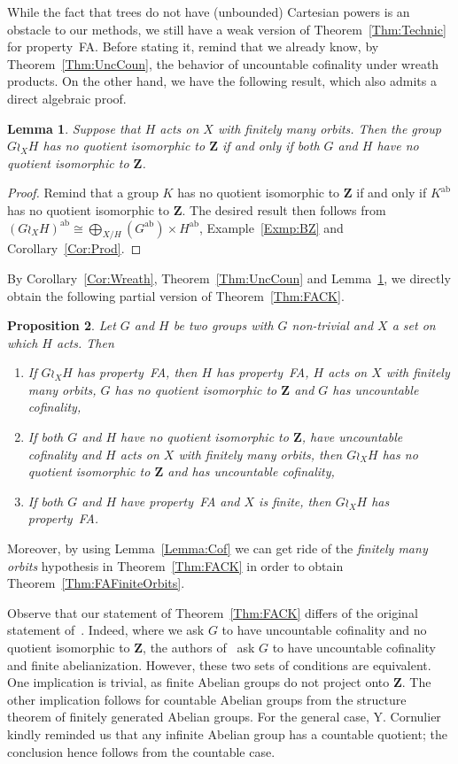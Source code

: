 \documentclass[a4paper]{article}
\newtheorem{lem}{Lemma}[section]
\newtheorem{prop}[lem]{Proposition}
\theoremstyle{definition}
\DeclareMathOperator\ab{ab}
\newcommand*{\field}[1]{\mathbf{#1}}
\newcommand*{\Z}{\field{Z}}
\newcommand*{\FA}{FA}
\begin{document}
%
%
While the fact that trees do not have (unbounded) Cartesian powers is an obstacle to our methods, we still have a weak version of Theorem~\ref{Thm:Technic} for property~FA.
Before stating it, remind that we already know, by Theorem~\ref{Thm:UncCoun}, the behavior of uncountable cofinality under wreath products.
On the other hand, we have the following result, which also admits a direct algebraic proof.
%
%
\begin{lem}\label{Lemma:Z}
Suppose that $H$ acts on $X$ with finitely many orbits.
Then the group $G\wr_XH$ has no quotient isomorphic to $\Z$ if and only if both $G$ and $H$ have no quotient isomorphic to $\Z$.
\end{lem}
\begin{proof}
Remind that a group $K$ has no quotient isomorphic to $\Z$ if and only if $K^{\ab}$ has no quotient isomorphic to $\Z$.
The desired result then follows from $(G\wr_XH)^{\ab}\cong \bigoplus_{X/H}(G^{\ab})\times H^{\ab}$, Example~\ref{Exmp:BZ} and Corollary~\ref{Cor:Prod}.
\end{proof}
%
%
By Corollary~\ref{Cor:Wreath}, Theorem~\ref{Thm:UncCoun} and Lemma~\ref{Lemma:Z}, we directly obtain the following partial version of Theorem~\ref{Thm:FACK}.
%
%
\begin{prop}\label{Prop:WRFA}
Let $G$ and $H$ be two groups with $G$ non-trivial and $X$ a set on which $H$ acts.
Then
\begin{enumerate}
\item If $G\wr_XH$ has property~\FA, then $H$ has property~\FA, $H$ acts on $X$ with finitely many orbits, $G$ has no quotient isomorphic to $\Z$ and $G$ has uncountable cofinality,
\item If both $G$ and $H$ have no quotient isomorphic to $\Z$, have uncountable cofinality and $H$ acts on $X$ with finitely many orbits, then $G\wr_XH$ has no quotient isomorphic to $\Z$ and has uncountable cofinality,
\item If both $G$ and $H$ have property~\FA{} and $X$ is finite, then $G\wr_XH$ has property~FA.
\end{enumerate}
\end{prop}
%
%
Moreover, by using Lemma~\ref{Lemma:Cof} we can get ride of the \emph{finitely many orbits} hypothesis in Theorem~\ref{Thm:FACK} in order to obtain Theorem~\ref{Thm:FAFiniteOrbits}.

Observe that our statement of Theorem~\ref{Thm:FACK} differs of the original statement of~\cite{Cornulier2011}.
Indeed, where we ask $G$ to have uncountable cofinality and no quotient isomorphic to $\Z$, the authors of~\cite{Cornulier2011} ask $G$ to have uncountable cofinality and finite abelianization.
However, these two sets of conditions are equivalent.
One implication is trivial, as finite Abelian groups do not project onto $\Z$. The other implication follows for countable Abelian groups from the structure theorem of finitely generated Abelian groups.
For the general case, Y. Cornulier kindly reminded us that any infinite Abelian group has a countable quotient; the conclusion hence follows from the countable case.
%
%
%
%
%
%
%
%
%
%


%
%
%
%
%
%
%
%
%
%
\end{document}
